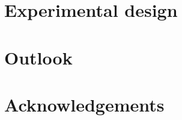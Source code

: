 \documentclass[
 aps,
 prb,
 a4paper,
 superscriptaddress,
 notitlepage,
 nofootinbib,
 preprint %
]{revtex4-1}
\begin{document}
\section{Experimental design}


\section{Outlook}



\section*{Acknowledgements}





\end{document}
